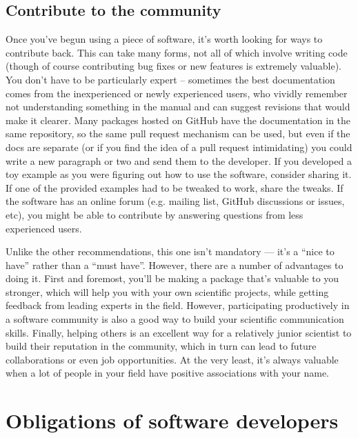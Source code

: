 \documentclass[9pt,training,pubversion]{livecoms}
\begin{document}
\subsection{Contribute to the community}

Once you've begun using a piece of software, it's worth looking for ways to
contribute back.  This can take many forms, not all of which involve writing
code (though of course contributing bug fixes or new features is extremely
valuable). You don't have to be particularly expert -- sometimes the best
documentation comes from the inexperienced or newly experienced users, who
vividly remember not understanding something in the manual and can suggest
revisions that would make it clearer.  Many packages hosted on GitHub have the
documentation in the same repository, so the same pull request mechanism can be
used, but even if the docs are separate (or if you find the idea of a pull
request intimidating) you could write a new paragraph or two and send them to
the developer. If you developed a toy example as you were figuring out how to
use the software, consider sharing it. If one of the provided examples had to be
tweaked to work, share the tweaks. If the software has an online forum (e.g.
mailing list, GitHub discussions or issues, etc), you might be able to
contribute by answering questions from less experienced users.

Unlike the other recommendations, this one isn't mandatory --- it's a ``nice to
have'' rather than a ``must have''. However, there are a number of advantages to
doing it. First and foremost, you'll be making a package that's valuable to you
stronger, which will help you with your own scientific projects, while getting
feedback from leading experts in the field. However, participating productively
in a software community is also a good way to build your scientific
communication skills. Finally, helping others is an excellent way for a
relatively junior scientist to build their reputation in the community, which in
turn can lead to future collaborations or even job opportunities. At the very
least, it's always valuable when a lot of people in your field have positive
associations with your name.

\section{Obligations of software developers}
\end{document}
